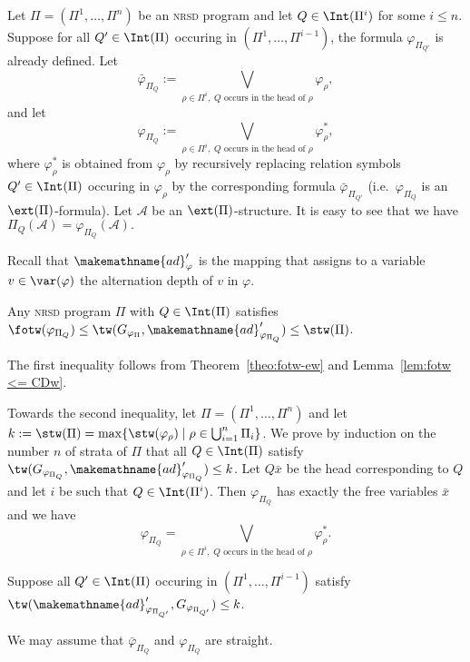 \documentclass{LMCS}
\newcommand{\nrsd}{\textsc{nrsd}}
\renewcommand{\phi}{\varphi}
\newcommand{\alte}{\makemathname{ad}}
\begin{document}
Let $\Pi=(\Pi^1,\ldots,\Pi^n)$ be an \nrsd{} program and let $Q\in\Int(\Pi^i)$
for some $i\leq n$. Suppose for all $Q'\in \Int(\Pi)$ occuring in 
$ (\Pi^1,\ldots,\Pi^{i-1})$, the formula $\phi_{\Pi_{Q'}}$ is already defined.
Let
\[\bar \phi_{\Pi_Q}:=
\bigvee_{\rho\in\Pi^i,\; Q\text{ occurs in the head of } \rho}\phi_{\rho},\]
and let
\[\phi_{\Pi_Q}:=
\bigvee_{\rho\in\Pi^i,\; Q\text{ occurs in the head of } \rho}\phi^*_{\rho},\]
where $\phi^*_{\rho}$ is obtained from $\phi_{\rho}$ by recursively replacing 
relation symbols $Q'\in\Int(\Pi)$ occuring in $\phi_{\rho}$ by the
corresponding formula $\bar\phi_{\Pi_{Q'}}$ (i.e.\ $\phi_{\Pi_Q}$ is an 
$\ext(\Pi)$-formula).
Let $\mathcal A$ be an $\ext(\Pi)$-structure. It is easy to see
that we have
$\Pi_Q(\mathcal A)=\phi_{\Pi_Q}(\mathcal A).$

Recall that $\alte'_{\phi}$ 
is the mapping that assigns to a variable $v\in\var(\varphi)$ the
alternation depth of $v$ in $\phi$. 

\begin{thm}\label{app:theo:datalog}
	Any \nrsd{} program $\Pi$ with $Q\in \Int(\Pi)$ satisfies\\ 
	$\fotw(\phi_{\Pi_Q})\leq\tw(G_{\phi_{\Pi}},\alte'_{\phi_{\Pi_Q}})\leq\stw(\Pi)$. 
\end{thm}


\proof The first inequality follows from  Theorem~\ref{theo:fotw-ew}
and Lemma~\ref{lem:fotw <= CDw}.

Towards the
second inequality, let
$\Pi=(\Pi^1,\ldots, \Pi^n)$ and let
$k:=\stw(\Pi)=\max\{\stw(\phi_{\rho})\mid \rho\in \bigcup_{i=1}^n\Pi_i\}$.
We prove by induction on the number $n$ of strata of $\Pi$ that all
$Q\in\Int(\Pi)$ satisfy $\tw(G_{\phi_{\Pi_Q}},\alte'_{\phi_{\Pi_Q}})\leq k$.
Let $Q\bar x$ be the head corresponding to $Q$ 
and let $i$ be such that $Q\in\Int(\Pi^i)$. 
Then
$\phi_{\Pi_Q}$ 
has exactly the free variables $\bar x$ and we have 
\[\phi_{\Pi_Q}=
\bigvee_{\rho\in\Pi^i,\; Q\text{ occurs in the head of } \rho}\phi^*_{\rho}.\]



\noindent Suppose all $Q'\in\Int(\Pi)$
occuring in $(\Pi^1,\ldots, \Pi^{i-1})$
satisfy $\tw(\alte'_{\phi_{\Pi_{Q'}}},G_{\phi_{\Pi_{Q'}}})\leq k$.

We may assume that $\bar \phi_{\Pi_Q}$ and $\phi_{\Pi_Q}$
are straight.
\end{document}
